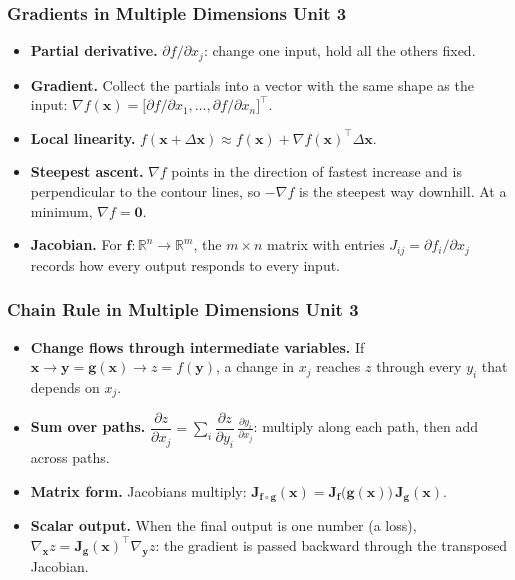 \documentclass[12pt]{beamer}
\newcommand{\FrameTitle}[2]{\frametitle{#1 \hfill \small\textnormal{\textcolor{midgray}{#2}}}}
\begin{document}
\begin{frame}\FrameTitle{Gradients in Multiple Dimensions}{Unit 3}
    \begin{itemize}
        \item \textbf{Partial derivative.} $\partial f/\partial x_j$: change one
              input, hold all the others fixed.
        \item \textbf{Gradient.} Collect the partials into a vector with the
              same shape as the input:
              $\nabla f(\symbf{x}) = \bigl[\partial f/\partial x_1, \dots,
              \partial f/\partial x_n\bigr]^\top$.
        \item \textbf{Local linearity.}
              $f(\symbf{x}+\Delta\symbf{x}) \approx f(\symbf{x})
              + \nabla f(\symbf{x})^\top \Delta\symbf{x}$.
        \item \textbf{Steepest ascent.} $\nabla f$ points in the direction of
              fastest increase and is perpendicular to the contour lines, so
              $-\nabla f$ is the steepest way downhill. At a minimum,
              $\nabla f = \symbf{0}$.
        \item \textbf{Jacobian.} For $\symbf{f}:\mathbb{R}^n \to \mathbb{R}^m$,
              the $m \times n$ matrix with entries
              $J_{ij} = \partial f_i/\partial x_j$ records how every output
              responds to every input.
    \end{itemize}
\end{frame}

\begin{frame}\FrameTitle{Chain Rule in Multiple Dimensions}{Unit 3}
    \begin{itemize}
        \item \textbf{Change flows through intermediate variables.} If
              $\symbf{x} \to \symbf{y} = \symbf{g}(\symbf{x}) \to z = f(\symbf{y})$,
              a change in $x_j$ reaches $z$ through every $y_i$ that depends
              on $x_j$.
        \item \textbf{Sum over paths.}
              $\displaystyle \dfrac{\partial z}{\partial x_j}
              = \sum_i \dfrac{\partial z}{\partial y_i}\,
                       \frac{\partial y_i}{\partial x_j}$:
              multiply along each path, then add across paths.
        \item \textbf{Matrix form.} Jacobians multiply:
              $\symbf{J}_{\symbf{f}\circ\symbf{g}}(\symbf{x})
              = \symbf{J}_{\symbf{f}}\bigl(\symbf{g}(\symbf{x})\bigr)\,
                \symbf{J}_{\symbf{g}}(\symbf{x})$.
        \item \textbf{Scalar output.} When the final output is one number
              (a loss),
              $\nabla_{\symbf{x}} z = \symbf{J}_{\symbf{g}}(\symbf{x})^\top
              \nabla_{\symbf{y}} z$: the gradient is passed backward through
              the transposed Jacobian.
    \end{itemize}
\end{frame}
\end{document}
